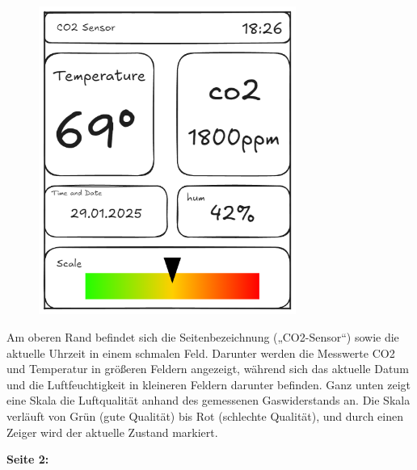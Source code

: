 \begin{inhalt}
\smallskip

\begin{figure}[!htb]
\centering
\includegraphics[width=0.75\textwidth]{files/Tobias/pics/Skizzen/Screen1_Sensor_Info.png}
\caption[Display Interface Skizze (Seite 1)]{}
\label{fig:display_skizze_seite_1}
\end{figure}

Am oberen Rand befindet sich die Seitenbezeichnung („CO2-Sensor“) sowie die aktuelle Uhrzeit in einem schmalen Feld. Darunter werden die Messwerte CO2 und Temperatur in größeren Feldern angezeigt, während sich das aktuelle Datum und die Luftfeuchtigkeit in kleineren Feldern darunter befinden. Ganz unten zeigt eine Skala die Luftqualität anhand des gemessenen Gaswiderstands an. Die Skala verläuft von Grün (gute Qualität) bis Rot (schlechte Qualität), und durch einen Zeiger wird der aktuelle Zustand markiert.

\begin{center}
    \textbf{Seite 2:}
\end{center}

\smallskip


\end{inhalt}
